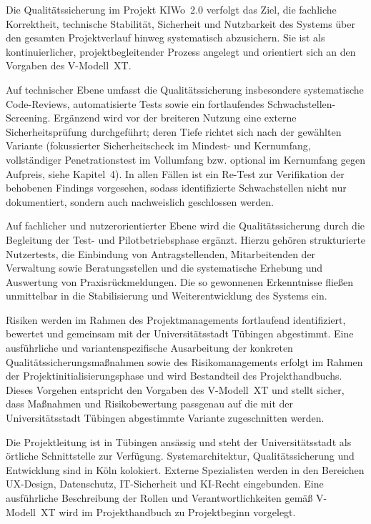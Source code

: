 \documentclass[11pt,a4paper,openany]{report}
\begin{document}
Die Qualitätssicherung im Projekt KIWo~2.0 verfolgt das Ziel, die
fachliche Korrektheit, technische Stabilität, Sicherheit und Nutzbarkeit
des Systems über den gesamten Projektverlauf hinweg systematisch
abzusichern. Sie ist als kontinuierlicher, projektbegleitender Prozess
angelegt und orientiert sich an den Vorgaben des V-Modell~XT.

Auf technischer Ebene umfasst die Qualitätssicherung insbesondere
systematische Code-Reviews, automatisierte Tests sowie ein fortlaufendes
Schwachstellen-Screening. Ergänzend wird vor der breiteren Nutzung eine
externe Sicherheitsprüfung durchgeführt; deren Tiefe richtet sich nach
der gewählten Variante (fokussierter Sicherheitscheck im Mindest- und
Kernumfang, vollständiger Penetrationstest im Vollumfang bzw. optional
im Kernumfang gegen Aufpreis, siehe Kapitel~4). In allen Fällen ist ein
Re-Test zur Verifikation der behobenen Findings vorgesehen, sodass
identifizierte Schwachstellen nicht nur dokumentiert, sondern auch
nachweislich geschlossen werden.

Auf fachlicher und nutzerorientierter Ebene wird die Qualitätssicherung
durch die Begleitung der Test- und Pilotbetriebsphase ergänzt. Hierzu
gehören strukturierte Nutzertests, die Einbindung von Antragstellenden,
Mitarbeitenden der Verwaltung sowie Beratungsstellen und die systematische
Erhebung und Auswertung von Praxisrückmeldungen. Die so gewonnenen
Erkenntnisse fließen unmittelbar in die Stabilisierung und
Weiterentwicklung des Systems ein.

Risiken werden im Rahmen des Projektmanagements fortlaufend identifiziert,
bewertet und gemeinsam mit der Universitätsstadt Tübingen abgestimmt.
Eine ausführliche und variantenspezifische Ausarbeitung der konkreten
Qualitätssicherungsmaßnahmen sowie des Risikomanagements erfolgt im
Rahmen der Projektinitialisierungsphase und wird Bestandteil des
Projekthandbuchs. Dieses Vorgehen entspricht den Vorgaben des
V-Modell~XT und stellt sicher, dass Maßnahmen und Risikobewertung
passgenau auf die mit der Universitätsstadt Tübingen abgestimmte
Variante zugeschnitten werden.

Die Projektleitung ist in Tübingen ansässig und steht der
Universitätsstadt als örtliche Schnittstelle zur Verfügung.
Systemarchitektur, Qualitätssicherung und Entwicklung sind in Köln
kolokiert. Externe Spezialisten werden in den Bereichen UX-Design,
Datenschutz, IT-Sicherheit und KI-Recht eingebunden. Eine ausführliche
Beschreibung der Rollen und Verantwortlichkeiten gemäß V-Modell~XT
wird im Projekthandbuch zu Projektbeginn vorgelegt.
\end{document}
